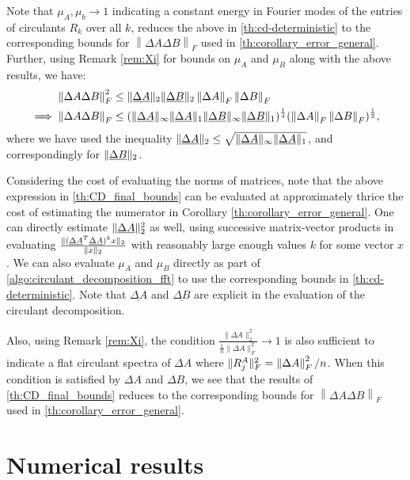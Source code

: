 \documentclass[onefignum,onetabnum]{siamart171218}
\newcommand{\normF}[1]{\left\|#1\right\|_F}
\newcommand{\DA}{\Delta\!A}
\newcommand{\DB}{\Delta\!B}
\DeclarePairedDelimiter\norm{\lVert}{\rVert}
\begin{document}
\begin{corollary}\label{th:CD_final_bounds}
Note that $\mu_A, \mu_b \to 1$ indicating a constant energy in Fourier modes of the entries of circulants $R_k$ over all $k$, reduces the above in \cref{th:cd-deterministic} to the corresponding bounds for $\normF{\DA \DB}$ used in \cref{th:corollary_error_general}. Further, using Remark \ref{rem:Xi} for bounds on $\mu_A$ and $\mu_B$ along with the above results, we have: 
\begin{align*}
\normF{\Delta A \Delta B}^2 & \leq \norm{\underline{\Delta A}}_2 \norm{\underline{\Delta B}}_2 \normF{\Delta A} \normF{\Delta B} \\
\implies \normF{\Delta A \Delta B} & \leq (\norm{\underline{\Delta A}}_\infty \norm{\underline{\Delta A}}_1 \norm{\underline{\Delta B}}_\infty \norm{\underline{\Delta B}}_1)^{\frac{1}{4}} (\normF{\Delta A} \normF{\Delta B})^{\frac{1}{2}},          
\end{align*}
where we have used the inequality $\norm{\underline{\Delta A}}_2 \leq \sqrt{\norm{\underline{\Delta A}}_\infty \norm{\underline{\Delta A}}_1}$, and correspondingly for $\norm{\underline{\Delta B}}_2$. 
\end{corollary}
Considering the cost of evaluating the norms of matrices, note that the above expression in \cref{th:CD_final_bounds} can be evaluated at approximately thrice the cost of estimating the numerator in Corollary \ref{th:corollary_error_general}. One can directly estimate $\norm{\underline{\Delta A}}_2^2$ as well, using successive matrix-vector products in evaluating $\frac{\norm{(\underline{\Delta A}^T\underline{\Delta A})^kx}_2}{\norm{x}_2}$ with reasonably large enough values $k$ for some vector $x$. We can also evaluate $\mu_A$ and $\mu_B$ directly as part of \cref{algo:circulant_decomposition_fft} to use the corresponding bounds in \cref{th:cd-deterministic}. Note that $\underline{\DA}$ and $\underline{\DB}$ are explicit in the evaluation of the circulant decomposition.

Also, using Remark \ref{rem:Xi}, the condition $\frac{\|\underline{\Delta A}\|^2_2}{\frac{1}{n}\|\Delta A\|_F^2} \rightarrow 1$ is also sufficient to indicate a flat circulant spectra of $\DA$ where $\norm{R_j^A}_F^2=\normF{\Delta A}^2/n$. When this condition is satisfied by $\DA$ and $\DB$, we see that the results of \cref{th:CD_final_bounds} reduces to the corresponding bounds for $\normF{\DA \DB}$ used in \cref{th:corollary_error_general}.


\section{Numerical results} \label{sec:results}
\end{document}

